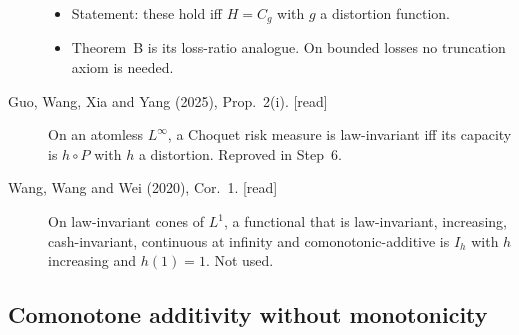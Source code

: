 \begin{description}
\begin{itemize}
  \item Statement: these hold iff $H=C_g$ with $g$ a distortion function.
  \item Theorem~B is its loss-ratio analogue. On bounded losses no truncation axiom is needed.
  \end{itemize}
\item[Guo, Wang, Xia and Yang (2025), Prop.~2(i). {[read]}] On an atomless $L^\infty$, a Choquet risk measure is law-invariant iff its capacity is $h\circ P$ with $h$ a distortion. Reproved in Step~6.
\item[Wang, Wang and Wei (2020), Cor.~1. {[read]}] On law-invariant cones of $L^1$, a functional that is law-invariant, increasing, cash-invariant, continuous at infinity and comonotonic-additive is $I_h$ with $h$ increasing and $h(1)=1$. Not used.
\end{description}

\subsection{Comonotone additivity without monotonicity}

